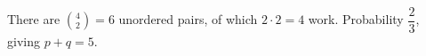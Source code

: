 There are $\binom42=6$ unordered pairs, of which $2\cdot2=4$ work. Probability $\dfrac{2}{3}$, giving $\boxed{p+q=5}$.

